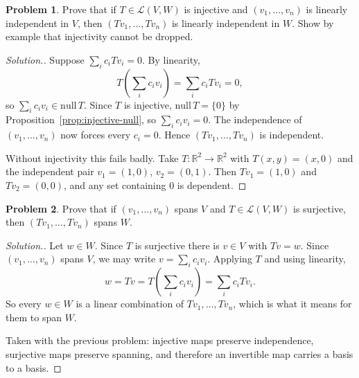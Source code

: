 \documentclass[11pt,a4paper]{article}
\theoremstyle{definition}
\newtheorem{problemx}{Problem}[section]
\newenvironment{problem}{\begin{problemx}}{\end{problemx}}
\newenvironment{solution}
  {\renewcommand{\qedsymbol}{}\begin{proof}[\textit{Solution}.]}
  {\end{proof}}
\begin{document}
\begin{problem}
Prove that if $T\in\mathcal{L}(V,W)$ is injective and $(v_1,\dots,v_n)$ is
linearly independent in $V$, then $(Tv_1,\dots,Tv_n)$ is linearly independent
in $W$. Show by example that injectivity cannot be dropped.
\end{problem}
\begin{solution}
Suppose $\sum_{i}c_iTv_i=0$. By linearity,
$$T\left(\sum_i c_iv_i\right)=\sum_i c_iTv_i=0,$$
so $\sum_i c_iv_i\in\text{null}\,T$. Since $T$ is injective,
$\text{null}\,T=\{0\}$ by Proposition~\ref{prop:injective-null}, so
$\sum_i c_iv_i=0$. The independence of $(v_1,\dots,v_n)$ now forces every
$c_i=0$. Hence $(Tv_1,\dots,Tv_n)$ is independent.

Without injectivity this fails badly. Take $T:\mathbb{R}^2\to\mathbb{R}^2$ with
$T(x,y)=(x,0)$ and the independent pair $v_1=(1,0)$, $v_2=(0,1)$. Then
$Tv_1=(1,0)$ and $Tv_2=(0,0)$, and any set containing $0$ is dependent.
\end{solution}

\begin{problem}
Prove that if $(v_1,\dots,v_n)$ spans $V$ and $T\in\mathcal{L}(V,W)$ is
surjective, then $(Tv_1,\dots,Tv_n)$ spans $W$.
\end{problem}
\begin{solution}
Let $w\in W$. Since $T$ is surjective there is $v\in V$ with $Tv=w$. Since
$(v_1,\dots,v_n)$ spans $V$, we may write $v=\sum_i c_iv_i$. Applying $T$ and
using linearity,
$$w=Tv=T\left(\sum_i c_iv_i\right)=\sum_i c_iTv_i.$$
So every $w\in W$ is a linear combination of $Tv_1,\dots,Tv_n$, which is what
it means for them to span $W$.

Taken with the previous problem: injective maps preserve independence,
surjective maps preserve spanning, and therefore an invertible map carries a
basis to a basis.
\end{solution}
\end{document}
